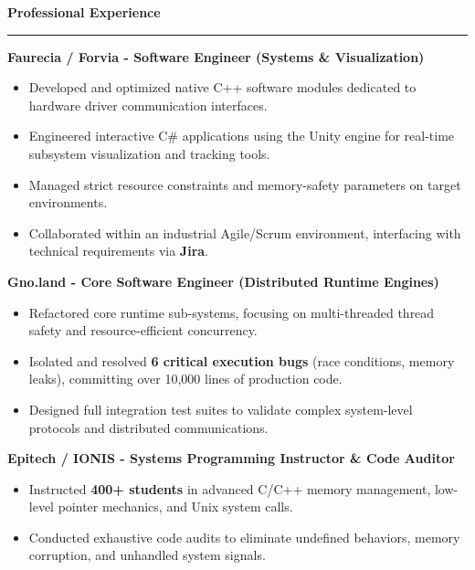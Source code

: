 \documentclass[9pt]{extarticle}
\begin{document}
\par\vspace{5pt}

{\large\bfseries Professional Experience}
\par\vspace{-8pt}
\rule{\linewidth}{0.4pt}
\par\vspace{5pt}

{\bfseries Faurecia / Forvia - Software Engineer (Systems \& Visualization)}
\begin{itemize}[noitemsep, topsep=0pt]
    \item Developed and optimized native C++ software modules dedicated to hardware driver communication interfaces.
    \item Engineered interactive C\# applications using the Unity engine for real-time subsystem visualization and tracking tools.
    \item Managed strict resource constraints and memory-safety parameters on target environments.
    \item Collaborated within an industrial Agile/Scrum environment, interfacing with technical requirements via {\bfseries Jira}.
\end{itemize}

\par\vspace{5pt}

{\bfseries Gno.land - Core Software Engineer (Distributed Runtime Engines)} %
\begin{itemize}[noitemsep, topsep=0pt]
    \item Refactored core runtime sub-systems, focusing on multi-threaded thread safety and resource-efficient concurrency. %
    \item Isolated and resolved {\bfseries 6 critical execution bugs} (race conditions, memory leaks), committing over 10,000 lines of production code. %
    \item Designed full integration test suites to validate complex system-level protocols and distributed communications.
\end{itemize}

\par\vspace{5pt}

{\bfseries Epitech / IONIS - Systems Programming Instructor \& Code Auditor} %
\begin{itemize}[noitemsep, topsep=0pt]
    \item Instructed {\bfseries 400+ students} in advanced C/C++ memory management, low-level pointer mechanics, and Unix system calls. %
    \item Conducted exhaustive code audits to eliminate undefined behaviors, memory corruption, and unhandled system signals.
\end{itemize}
\end{document}
